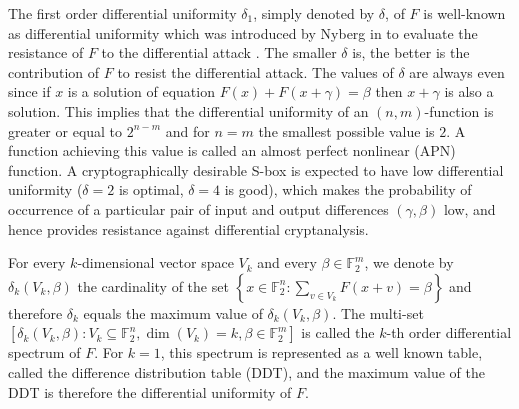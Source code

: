 \documentclass[12 pt]{article}
\def\F{{\mathbb F}}
\begin{document}
  The first order differential uniformity $\delta_1$, simply denoted by $\delta$, of $F$ is well-known as differential uniformity which was introduced by Nyberg in \cite{Nyberg94} to evaluate the resistance of $F$ to the differential attack \cite{BS91}. 
  The smaller $\delta$ is, the better is the contribution of $F$ to resist the differential attack. 
  The values of $\delta$ are always even since if $x$ is a solution of equation $F(x)+ F(x+\gamma)=\beta$ then $x+\gamma$ is also a solution. 
  This implies that the differential uniformity of an $(n,m)$-function is greater or equal to $2^{n-m}$ and for $n=m$ the smallest possible value is $2$. 
  A function achieving this value is called an almost perfect nonlinear (APN) function. 
  A cryptographically desirable S-box is expected to have low differential uniformity ($\delta=2$ is optimal, $\delta=4$ is good), which makes the probability of occurrence of a particular pair of input and output differences $(\gamma,\beta)$ low, and hence provides resistance against differential cryptanalysis. 
  
  For every $k$-dimensional vector space $V_k$ and every $\beta\in\F_2^m$, we denote by $\delta_k(V_k,\beta)$ the cardinality of the set $\left\{x\in\F_2^n:\sum_{v\in V_k}F(x+v)=\beta\right\}$ and therefore $\delta_k$ equals the maximum value of $\delta_k(V_k,\beta)$. 
  The multi-set $ \left[ \delta_k(V_k,\beta):V_k\subseteq\F_2^n,\dim(V_k)=k,\beta\in\F_2^m \right] $ is called the $k$-th order differential spectrum of $F$. 
  For $k=1$, this spectrum is represented as a well known table, called the difference distribution table (DDT), and the maximum value of the DDT is therefore the differential uniformity of $F$.
\end{document}
